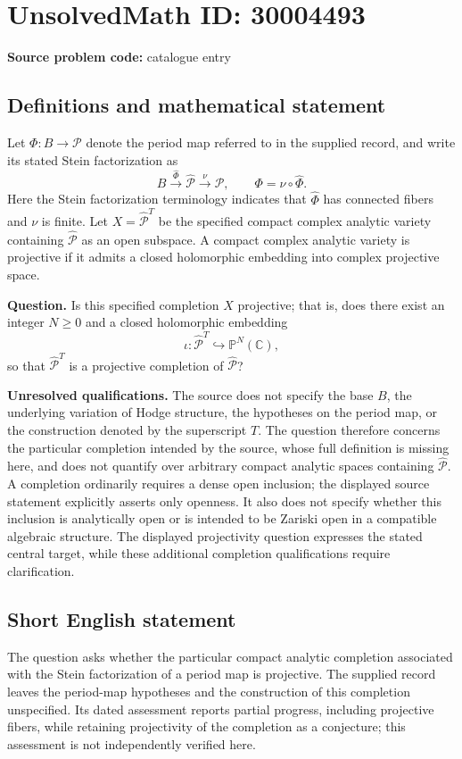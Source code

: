 \documentclass[11pt]{article}
\newcommand{\C}{\mathbb{C}}
\newcommand{\PP}{\mathbb{P}}
\begin{document}
\section*{UnsolvedMath ID: 30004493}
\textbf{Source problem code:} catalogue entry
\subsection{Definitions and mathematical statement}
Let \(\Phi:B\to\mathcal P\) denote the period map referred to in the supplied record, and write its stated Stein factorization as
\[
B\xrightarrow{\widehat\Phi}\widehat{\mathcal P}\xrightarrow{\nu}\mathcal P,
\qquad \Phi=\nu\circ\widehat\Phi.
\]
Here the Stein factorization terminology indicates that \(\widehat\Phi\) has connected fibers and \(\nu\) is finite. Let \(X=\widehat{\mathcal P}^{T}\) be the specified compact complex analytic variety containing \(\widehat{\mathcal P}\) as an open subspace. A compact complex analytic variety is projective if it admits a closed holomorphic embedding into complex projective space.

\textbf{Question.} Is this specified completion \(X\) projective; that is, does there exist an integer \(N\geq 0\) and a closed holomorphic embedding
\[
\iota:\widehat{\mathcal P}^{T}\hookrightarrow\PP^{N}(\C),
\]
so that \(\widehat{\mathcal P}^{T}\) is a projective completion of \(\widehat{\mathcal P}\)?

\textbf{Unresolved qualifications.} The source does not specify the base \(B\), the underlying variation of Hodge structure, the hypotheses on the period map, or the construction denoted by the superscript \(T\). The question therefore concerns the particular completion intended by the source, whose full definition is missing here, and does not quantify over arbitrary compact analytic spaces containing \(\widehat{\mathcal P}\). A completion ordinarily requires a dense open inclusion; the displayed source statement explicitly asserts only openness. It also does not specify whether this inclusion is analytically open or is intended to be Zariski open in a compatible algebraic structure. The displayed projectivity question expresses the stated central target, while these additional completion qualifications require clarification.
\subsection{Short English statement}
The question asks whether the particular compact analytic completion associated with the Stein factorization of a period map is projective. The supplied record leaves the period-map hypotheses and the construction of this completion unspecified. Its dated assessment reports partial progress, including projective fibers, while retaining projectivity of the completion as a conjecture; this assessment is not independently verified here.
\end{document}
